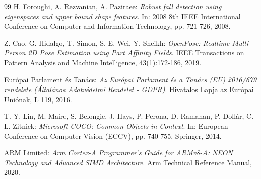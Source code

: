 \documentclass[12pt,a4paper,oneside]{report}
\begin{document}
\begin{thebibliography}{99}
H. Foroughi, A. Rezvanian, A. Paziraee: \textit{Robust fall detection using eigenspaces and upper bound shape features}. In: 2008 8th IEEE International Conference on Computer and Information Technology, pp. 721-726, 2008.

Z. Cao, G. Hidalgo, T. Simon, S.-E. Wei, Y. Sheikh: \textit{OpenPose: Realtime Multi-Person 2D Pose Estimation using Part Affinity Fields}. IEEE Transactions on Pattern Analysis and Machine Intelligence, 43(1):172-186, 2019.

Európai Parlament és Tanács: \textit{Az Európai Parlament és a Tanács (EU) 2016/679 rendelete (Általános Adatvédelmi Rendelet - GDPR)}. Hivatalos Lapja az Európai Uniónak, L 119, 2016.

T.-Y. Lin, M. Maire, S. Belongie, J. Hays, P. Perona, D. Ramanan, P. Dollár, C. L. Zitnick: \textit{Microsoft COCO: Common Objects in Context}. In: European Conference on Computer Vision (ECCV), pp. 740-755, Springer, 2014.

ARM Limited: \textit{Arm Cortex-A Programmer's Guide for ARMv8-A: NEON Technology and Advanced SIMD Architecture}. Arm Technical Reference Manual, 2020.
\end{thebibliography}
\end{document}
